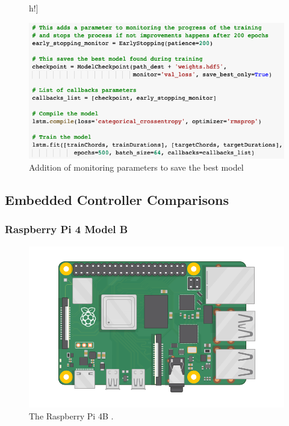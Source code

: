 \begin{figure}[]h!]
  \caption{Addition of monitoring parameters to save the best model}
  \includegraphics[width=\linewidth]{image/fig_JDF26.png}
\end{figure}

\subsection{Embedded Controller Comparisons}
\label{sec:embedded_controllers}

\subsubsection{Raspberry Pi 4 Model B}

\begin{figure}[h!]
  \centering
  \includegraphics[width=\linewidth]{image/raspberry-pi.png}
  \caption{The Raspberry Pi 4B \autocite{raspberry-pi-4b}.}
  \label{fig:rpi4b}
\end{figure}

